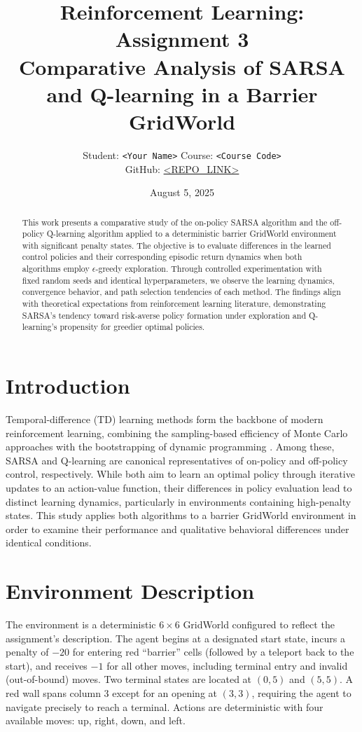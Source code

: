 \documentclass[11pt]{article}
\title{Reinforcement Learning: Assignment 3\\\large Comparative Analysis of SARSA and Q-learning in a Barrier GridWorld}
\author{Student: \texttt{<Your Name>} \quad Course: \texttt{<Course Code>}\\
\small GitHub: \href{<REPO_LINK>}{<REPO_LINK>}}
\date{August 5, 2025}
\begin{document}
\maketitle

\begin{abstract}
This work presents a comparative study of the on-policy SARSA algorithm and the off-policy Q-learning algorithm applied to a deterministic barrier GridWorld environment with significant penalty states. 
The objective is to evaluate differences in the learned control policies and their corresponding episodic return dynamics when both algorithms employ $\epsilon$-greedy exploration.
Through controlled experimentation with fixed random seeds and identical hyperparameters, we observe the learning dynamics, convergence behavior, and path selection tendencies of each method.
The findings align with theoretical expectations from reinforcement learning literature, demonstrating SARSA's tendency toward risk-averse policy formation under exploration and Q-learning's propensity for greedier optimal policies.
\end{abstract}

\section{Introduction}
Temporal-difference (TD) learning methods form the backbone of modern reinforcement learning, combining the sampling-based efficiency of Monte Carlo approaches with the bootstrapping of dynamic programming \cite{sutton2018reinforcement}.
Among these, SARSA and Q-learning are canonical representatives of on-policy and off-policy control, respectively.
While both aim to learn an optimal policy through iterative updates to an action-value function, their differences in policy evaluation lead to distinct learning dynamics, particularly in environments containing high-penalty states.
This study applies both algorithms to a barrier GridWorld environment in order to examine their performance and qualitative behavioral differences under identical conditions.

\section{Environment Description}
The environment is a deterministic $6\times6$ GridWorld configured to reflect the assignment's description.
The agent begins at a designated start state, incurs a penalty of $-20$ for entering red ``barrier'' cells (followed by a teleport back to the start), and receives $-1$ for all other moves, including terminal entry and invalid (out-of-bound) moves.
Two terminal states are located at $(0,5)$ and $(5,5)$.
A red wall spans column $3$ except for an opening at $(3,3)$, requiring the agent to navigate precisely to reach a terminal.
Actions are deterministic with four available moves: up, right, down, and left.
\end{document}
